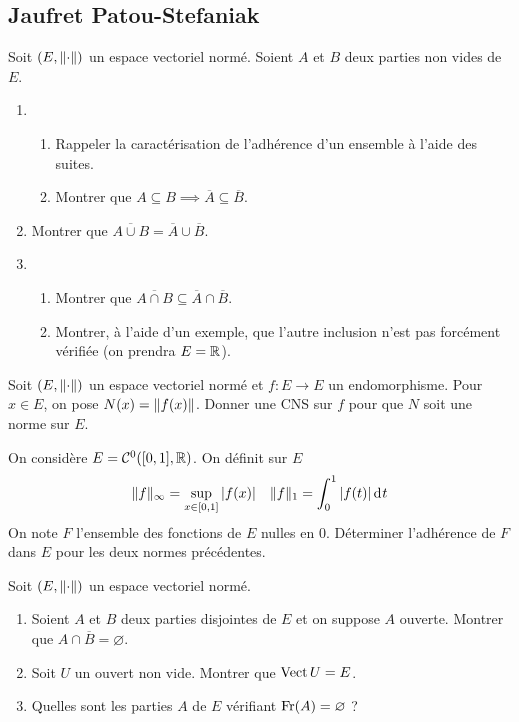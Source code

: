 \documentclass[10pt]{scrartcl}
\begin{document}
    \newpage
    \subsection*{Jaufret Patou-Stefaniak}
    \begin{ccp}
        Soit $(E,\lVert \cdot\rVert)$ un espace vectoriel normé. Soient $A$ et $B$ deux parties non vides de $E$.
        \begin{enumerate}
            \item 
            \begin{enumerate}
                \item Rappeler la caractérisation de l'adhérence d'un ensemble à l'aide des suites.
                \item Montrer que $A\subseteq B\implies \overline A\subseteq\overline B$.
            \end{enumerate}
            \item Montrer que $\overline{A\cup B}=\overline A\cup\overline B$.
            \item 
            \begin{enumerate}
                \item Montrer que $\overline{A\cap B}\subseteq \overline A\cap\overline B$.
                \item Montrer, à l'aide d'un exemple, que l'autre inclusion n'est pas forcément vérifiée (on prendra $E=\operatorname{\mathbb R}$).
            \end{enumerate}
        \end{enumerate}
    \end{ccp}

    \begin{exo}
        Soit $(E,\lVert \cdot\rVert)$ un espace vectoriel normé et $f:E\to E$ un endomorphisme. 
        Pour $x\in E$, on pose $N(x)=\lVert f(x)\rVert$. 
        Donner une CNS sur $f$ pour que $N$ soit une norme sur $E$.
    \end{exo}

    \begin{exo}
        On considère $E=\mathcal C^0([0,1],\operatorname{\mathbb R})$. On définit sur $E$
        \[
            \lVert f\rVert_\infty=\sup_{x\in[0,1]}|f(x)|\quad \lVert f\rVert_1=\int_0^1|f(t)|\operatorname{d\hskip-1pt} t
        \]
        On note $F$ l'ensemble des fonctions de $E$ nulles en $0$. 
        Déterminer l'adhérence de $F$ dans $E$ pour les deux normes précédentes.
    \end{exo}

    \begin{exo}
        Soit $(E,\lVert \cdot\rVert)$ un espace vectoriel normé.
        \begin{enumerate}
            \item Soient $A$ et $B$ deux parties disjointes de $E$ et on suppose $A$ ouverte. Montrer que $A\cap\overline B=\varnothing$.
            \item Soit $U$ un ouvert non vide. Montrer que $\operatorname{Vect} U=E$.
            \item Quelles sont les parties $A$ de $E$ vérifiant $\operatorname{Fr}(A)=\varnothing$ ?
        \end{enumerate}
    \end{exo}
\end{document}
